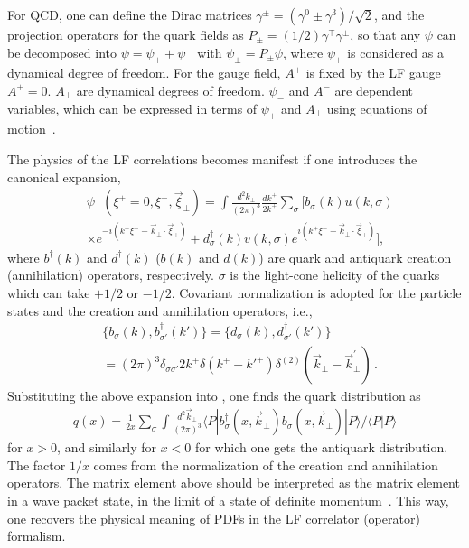For QCD, one can define the Dirac matrices
$\gamma^\pm = (\gamma^0\pm\gamma^3)/\sqrt{2}$, and the
projection operators for the quark fields
as $P_\pm = (1/2)\gamma^\mp\gamma^\pm$, so that any $\psi$
can be decomposed into $\psi=\psi_++\psi_-$ with
$\psi_\pm = P_\pm \psi$, where $\psi_+$ is considered as a dynamical degree of freedom.
For the gauge field, $A^+$ is fixed by the LF gauge
$A^+=0$. $A_\perp$ are dynamical degrees of freedom. $\psi_-$ and $A^-$ are dependent variables, which can be expressed in
terms of $\psi_+$ and $A_\perp$ using equations of motion~\cite{Kogut:1969xa}.

The physics of the LF correlations becomes manifest
if one introduces the canonical expansion,
\begin{align}
	& \psi_+(\xi^+=0,\xi^-,\vec{\xi}_\perp)
	= \int \frac{d^2k_\perp}{ (2\pi)^3}
	\frac{dk^+}{ 2k^+}\sum_\sigma \Big[ b_\sigma(k) u({k,\sigma})
	\nonumber \\
	&  \times e^{-i(k^+\xi^--\vec{k}_\perp\cdot\vec{\xi}_\perp)}
	+ d_\sigma^\dagger(k) v({k,\sigma})e^{i(k^+\xi^--\vec{k}_\perp\cdot\vec{\xi}_\perp)}
	\Big],
\end{align}
where $b^\dagger(k)$ and $d^\dagger(k)$ ($b(k)$ and $d(k)$) are quark and antiquark creation (annihilation)
operators, respectively. {$\sigma$ is the light-cone
	helicity of the quarks which can take $+1/2$ or $-1/2$.} Covariant normalization is adopted for the particle
states and the creation and annihilation operators, i.e.,
\begin{align}
	& \big\{b_\sigma(k),b_{\sigma'}^\dagger(k')\big\}=
	\big\{d_\sigma(k),d_{\sigma'}^\dagger(k')\big\} \nonumber \\
	& =(2\pi)^3\delta_{\sigma\sigma'}2k^+\delta(k^+-k'^{+})
	\delta^{(2)}(\vec{k}_\perp-\vec{k}_\perp^\prime)\,.
\end{align}
Substituting the above expansion into , one finds the quark distribution as
\begin{align}
	q(x) = \frac{1}{2x} \sum_\sigma \int \frac{d^2{\vec k}_\perp}{(2\pi)^3}
	\langle P|b_\sigma^\dagger(x,\vec{k}_\perp)b_\sigma(x,\vec{k}_\perp)|P\rangle/\langle P|P\rangle
	\label{eq:partonfock}
\end{align}
for $x>0$, and similarly for $x<0$ for which one gets the antiquark distribution.
The factor $1/x$ comes from the normalization of the creation and annihilation operators. The matrix element above should be interpreted as the matrix element in a wave packet state, in the limit of a state of definite momentum~\cite{Collins:2011zzd}.
This way, one recovers the physical meaning of PDFs in the LF correlator (operator) formalism.

